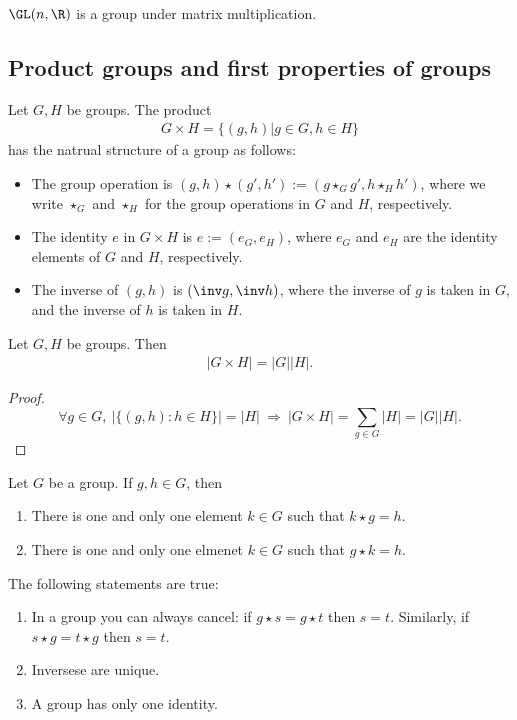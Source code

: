 \documentclass{article}
\begin{document}
\begin{theorem}
    $\GL(n,\R)$ is a group under matrix multiplication.
\end{theorem}

\subsection{Product groups and first properties of groups}

\begin{theorem}
    Let $G,H$ be groups. The product
    \begin{align*}
        G\times H=\{(g,h)|g\in G, h\in H\}
    \end{align*}
    has the natrual structure of a group as follows:
    \begin{itemize}
        \item The group operation is $(g,h)\star(g',h'):=(g\star_G g', h\star_H h')$, 
        where we write $\star_G$ and $\star_H$ for the group operations in $G$ and $H$, respectively.
        \item The identity $e$ in $G\times H$ is $e:=(e_G, e_H)$, where $e_G$ and 
        $e_H$ are the identity elements of $G$ and $H$, respectively.
        \item The inverse of $(g,h)$ is $(\inv g, \inv h)$, where the inverse of $g$ is taken in $G$,
        and the inverse of $h$ is taken in $H$.
    \end{itemize}
\end{theorem}

\begin{corollary*}
    Let $G,H$ be groups. Then
    \begin{align*}
        |G\times H| = |G||H|.
    \end{align*}
    \begin{proof}
        $$\forall g\in G,\:|\{(g,h) : h\in H\}|=|H| \:\Rightarrow\: |G\times H| = \sum_{g\in G}|H| = |G||H|.$$
    \end{proof}
\end{corollary*}

\setcounter{theorem}{5}
\begin{lemma}
    Let $G$ be a group. If $g,h\in G$, then
    \begin{enumerate}
        \item There is one and only one element $k\in G$ such that $k\star g=h$.
        \item There is one and only one elmenet $k\in G$ such that $g\star k=h$.
    \end{enumerate}
\end{lemma}

\setcounter{theorem}{7}
\begin{corollary}
    The following statements are true:
    \begin{enumerate}
        \item In a group you can always cancel: if $g\star s=g\star t$ 
        then $s=t$. Similarly, if $s\star g=t\star g$ then $s=t$.
        \item Inversese are unique.
        \item A group has only one identity.
    \end{enumerate}
\end{corollary}
\end{document}
